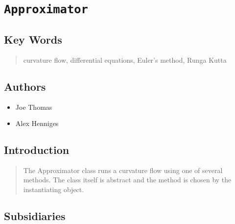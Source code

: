 \documentclass[10pt]{article}%
\begin{document}

\section*{\texttt{Approximator}}

\label{f0}\begin{quotation} \end{quotation}
\subsection*{Key Words}

\begin{quotation} curvature flow, differential equations, Euler's method, Runga Kutta\end{quotation}

\subsection*{Authors}

\begin{itemize}\item  Joe Thomas
\item  Alex Henniges
\end{itemize}

\subsection*{Introduction}

\begin{quotation} The Approximator class runs a curvature flow using one of several methods. The class itself is abstract and the method is chosen by the instantiating object.\end{quotation}

\subsection*{Subsidiaries}
\end{document}

